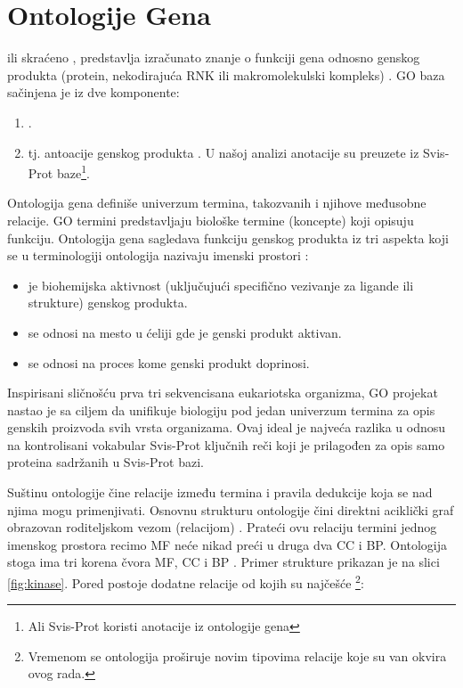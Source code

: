 \section{Ontologije Gena}


  ili skraćeno , 
predstavlja izračunato znanje o funkciji gena odnosno genskog
produkta (protein, nekodirajuća RNK ili makromolekulski kompleks)
\parencite{GO2016}.
GO baza sačinjena je iz dve komponente:
\begin{enumerate}
  \item {}.
  \item {} tj. antoacije genskog produkta . U našoj
    analizi anotacije su preuzete iz Svis-Prot baze\footnote{Ali Svis-Prot koristi anotacije iz ontologije gena}.
\end{enumerate}

Ontologija gena definiše univerzum termina, takozvanih 
 i njihove međusobne relacije. GO termini predstavljaju biološke
termine (koncepte) koji opisuju funkciju. Ontologija gena sagledava funkciju
genskog produkta iz tri aspekta koji se u terminologiji ontologija nazivaju
imenski prostori :
\begin{itemize}
  \item {} je biohemijska aktivnost (uključujući
    specifično vezivanje za ligande ili strukture) genskog produkta.
  \item {} se odnosi na mesto u ćeliji gde je
    genski produkt aktivan.
  \item {} se odnosi na proces kome genski produkt
    doprinosi.
\end{itemize}

Inspirisani sličnošću prva tri sekvencisana eukariotska organizma, GO projekat
nastao je sa ciljem da  unifikuje biologiju pod jedan univerzum termina za opis
genskih proizvoda svih vrsta organizama\parencite{GO2000}. Ovaj ideal je najveća
razlika u odnosu na kontrolisani vokabular Svis-Prot ključnih reči koji je
prilagođen za opis samo proteina sadržanih u Svis-Prot bazi.

Suštinu ontologije čine relacije između termina i pravila dedukcije koja se nad
njima mogu primenjivati. Osnovnu strukturu ontologije čini direktni aciklički
graf  obrazovan roditeljskom vezom (relacijom) . Prateći
ovu relaciju termini jednog imenskog prostora recimo MF neće nikad preći u
druga dva CC i BP.  Ontologija stoga ima tri korena čvora MF, CC i BP
\parencite{go_struktura}. Primer strukture prikazan je na
slici \ref{fig:kinase}.  Pored  postoje dodatne relacije od kojih
su najčešće \footnote{Vremenom se ontologija proširuje novim tipovima relacije
koje su van okvira ovog rada.}:

